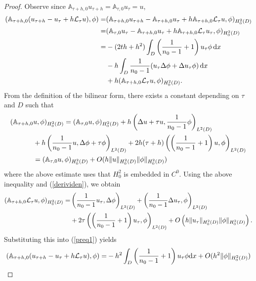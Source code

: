 \documentclass[12pt]{article}
\begin{document}
\begin{proof}
Observe since $\mathbb{A}_{\tau+h,0}u_{\tau+h}=\mathbb{A}_{\tau,0}u_\tau=u$,
\begin{align}\label{preq1}
(\mathbb{A}_{\tau+h,0}(u_{\tau+h}-u_\tau+h {\mathcal L}_\tau u),\phi)=&
(\mathbb{A}_{\tau+h,0}u_{\tau+h}-\mathbb{A}_{\tau+h,0}u_\tau + h\mathbb{A}_{\tau+h,0}{\mathcal L}_\tau u, \phi)_{H^2_0(D)}\notag \\
=&(\mathbb{A}_{\tau,0}u_{\tau}-\mathbb{A}_{\tau+h,0}u_\tau + h\mathbb{A}_{\tau+h,0}{\mathcal L}_\tau u_\tau, \phi)_{H^2_0(D)}\notag \\
=&-(2th+h^2) \int_{D}\left( \frac{1}{n_0-1}+1 \right )u_\tau \phi \, \mathrm{d}x \notag \\
&-h
\int_D \frac{1}{n_0-1} (u_\tau \Delta\phi + \Delta u_\tau \phi)\,\mathrm{d}x\notag \\
&+ h(\mathbb{A}_{\tau+h,0}{\mathcal L}_\tau u, \phi)_{H^2_0(D)}.\end{align}
\noindent 
From the definition of the bilinear form, there exists a constant depending on $\tau$ and $D$ such that
\begin{align}
(\mathbb{A}_{\tau+h,0}&u,\phi)_{H^2_0(D)}=( \mathbb{A}_{\tau,0}u,\phi)_{H^2_0(D)} +h\left (\Delta u + \tau u, \frac{1}{n_0-1}\phi \right)_{L^2(D)} \notag \\ 
&+ h \left (\frac{1}{n_0-1} u, \Delta \phi + \tau \phi \right )_{L^2(D)} + 2h(\tau+h)\left ( \left( \frac{1}{n_0-1}+1 \right ) u,\phi \right )_{L^2(D)} \notag \\
&=  ( \mathbb{A}_{\tau,0}u,\phi)_{H^2_0(D)} + O(h\|u\|_{H^2_0(D)}\|\phi\|_{H^2_0(D)})
\end{align}
where the above estimate uses that $H^2_0$ is embedded in $C^0$.
Using the above inequality and (\ref{derividen}), we obtain
\begin{align}
(\mathbb{A}_{\tau+h,0}{\mathcal L}_\tau u, \phi)_{H^2_0(D)}=&
\left ( \frac{1}{n_0-1} u_\tau, \Delta \phi\right)_{L^2(D)} +\left ( \frac{1}{n_0-1} \Delta u_\tau, \phi\right)_{L^2(D)} \notag \\&
+ 2\tau\left ( \left( \frac{1}{n_0-1}+1 \right ) u_\tau, \phi\right )_{L^2(D)}
+O\left (h\|u_\tau\|_{H^2_0(D)}\|\phi\|_{H^2_0(D)}\right ).
\end{align}
Substituting this into (\ref{preq1}) yields
\begin{align}
(\mathbb{A}_{\tau+h,0}(u_{\tau+h}-u_\tau+h {\mathcal L}_\tau u),\phi)=&
-h^2 \int_{D} \left( \frac{1}{n_0-1}+1 \right )u_\tau \phi \mathrm{d} x + O(h^2\|\phi\|_{H^2_0(D)}) \notag \\

\end{align}
\end{proof}
\end{document}
